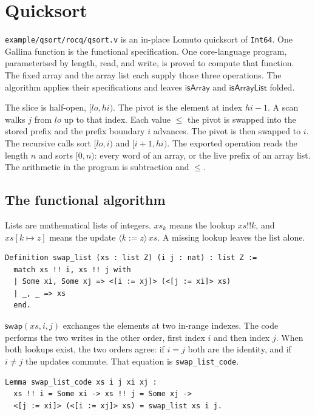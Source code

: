\documentclass[11pt]{article}
\begin{document}


\section{Quicksort}
\label{sec:qsort}

\texttt{example/qsort/rocq/qsort.v} is an in-place Lomuto quicksort of \texttt{Int64}.
One Gallina function is the functional specification.
One core-language program, parameterised by length, read, and write, is proved to compute that function.
The fixed array and the array list each supply those three operations.
The algorithm applies their specifications and leaves \(\mathsf{isArray}\) and \(\mathsf{isArrayList}\) folded.

The slice is half-open, \([lo, hi)\).
The pivot is the element at index \(hi - 1\).
A scan walks \(j\) from \(lo\) up to that index.
Each value \(\le\) the pivot is swapped into the stored prefix and the prefix boundary \(i\) advances.
The pivot is then swapped to \(i\).
The recursive calls sort \([lo, i)\) and \([i+1, hi)\).
The exported operation reads the length \(n\) and sorts \([0, n)\): every word of an array, or the live prefix of an array list.
The arithmetic in the program is subtraction and \(\le\).

\subsection{The functional algorithm}

Lists are mathematical lists of integers.
\(xs_k\) means the lookup \(xs !! k\), and \(xs[k \mapsto z]\) means the update \(\langle k := z \rangle\, xs\).
A missing lookup leaves the list alone.

\begin{lstlisting}
Definition swap_list (xs : list Z) (i j : nat) : list Z :=
  match xs !! i, xs !! j with
  | Some xi, Some xj => <[i := xj]> (<[j := xi]> xs)
  | _, _ => xs
  end.
\end{lstlisting}

\(\mathsf{swap}(xs, i, j)\) exchanges the elements at two in-range indexes.
The code performs the two writes in the other order, first index \(i\) and then index \(j\).
When both lookups exist, the two orders agree: if \(i = j\) both are the identity, and if \(i \neq j\) the updates commute.
That equation is \texttt{swap\_list\_code}.

\begin{lstlisting}
Lemma swap_list_code xs i j xi xj :
  xs !! i = Some xi -> xs !! j = Some xj ->
  <[j := xi]> (<[i := xj]> xs) = swap_list xs i j.
\end{lstlisting}
\end{document}
